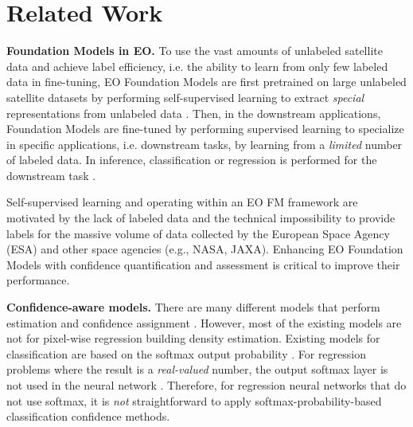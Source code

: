 \section{Related Work}
\noindent \textbf{Foundation Models in EO.} To use the vast amounts of unlabeled satellite data and achieve label efficiency, i.e. the ability to learn from only few labeled data in fine-tuning, EO Foundation Models are first pretrained on large unlabeled satellite datasets by performing self-supervised learning to extract \textit{special} representations from unlabeled data \cite{Prithvi1, newsatmaepp}. 
Then, in the downstream applications, Foundation Models are fine-tuned by performing supervised learning to specialize in specific applications, i.e. downstream tasks, by learning from a \textit{limited} number of labeled data.
In inference, classification or regression is performed for the downstream task \cite{Fibaek1, Prithvi1}.



\iffalse   
Such tasks that are “downstream” from EO data require the acquisition of labels.  
Also, because Earth is dynamic, labels \textit{change} over time.

and having annotations for a geographical region at a specific point in time 
is not enough. 
\fi 

Self-supervised learning and operating within an EO FM framework \cite{YiWangTUMPaper2025, PrithviIBMNASA} are motivated by the lack of labeled data and the technical impossibility to provide labels for the massive volume of data collected by the European Space Agency (ESA) and other space agencies (e.g., NASA, JAXA). 
Enhancing EO Foundation Models with confidence quantification and assessment is critical to improve their performance. 






\textbf{Confidence-aware models.}   
\noindent There are many different models that perform estimation and confidence assignment \cite{Confquantification2, regressionregressionnew2, regressionuseuseuse}. However, most of the existing models are not for pixel-wise regression building density estimation. Existing models for classification are based on the softmax output probability \cite{Confquantification1}.    
For regression problems where the result is a \textit{real-valued} number, the output softmax layer is not used in the neural network \cite{regressionregressionnew1}.               
Therefore, for regression neural networks that do not use softmax, it is \textit{not} straightforward to apply softmax-probability-based classification confidence methods.

